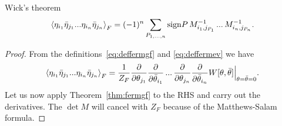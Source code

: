 \begin{theorem}{Wick's theorem}{}
$$
  \ev{\eta_{i_1}\bar{\eta}_{j_1}...\eta_{i_n}\bar{\eta}_{j_n}}_F
  =(-1)^n\sum_{P_{1,...,n}}\sign P\,
   M^{-1}_{i_1,j_{P_1}}\,...\,M^{-1}_{i_n,j_{P_n}}.
$$
\begin{proof} From the definitions~\eqref{eq:deffermgf} and
  \eqref{eq:deffermev} we have
  $$
    \ev{\eta_{i_1}\bar{\eta}_{j_1}...\eta_{i_n}\bar{\eta}_{j_n}}_F
    =\frac{1}{Z_F}
    \pdv{\theta_{j_1}}
    \pdv{\bar{\theta}_{i_1}}\,...\,
    \pdv{\theta_{j_n}}
    \pdv{\bar{\theta}_{i_n}}W[\theta,\bar{\theta}]
    \Big|_{\theta=\bar{\theta}=0}.
  $$
  Let us now apply Theorem~\ref{thm:fermgf} to the RHS and carry
  out the derivatives. The $\det M$ will cancel with $Z_F$ because
  of the Matthews-Salam formula. 
\end{proof}
\end{theorem}

